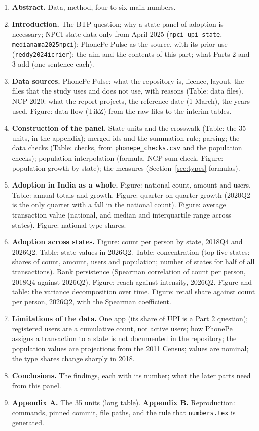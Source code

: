 \documentclass[11pt,a4paper]{article}
\newcommand{\f}[1]{\texttt{#1}}
\begin{document}
\begin{enumerate}
  \item \textbf{Abstract.} Data, method, four to six main numbers.
  \item \textbf{Introduction.} The BTP question; why a state panel of adoption is necessary; NPCI
        state data only from April 2025 (\f{npci\_upi\_state}, \f{medianama2025npci}); PhonePe Pulse as
        the source, with its prior use (\f{reddy2024icrier}); the aim and the contents of this part;
        what Parts 2 and 3 add (one sentence each).
  \item \textbf{Data sources.} PhonePe Pulse: what the repository is, licence, layout, the files that
        the study uses and does not use, with reasons (Table: data files). NCP 2020: what the report
        projects, the reference date (1 March), the years used. Figure: data flow (TikZ) from the raw
        files to the interim tables.
  \item \textbf{Construction of the panel.} State units and the crosswalk (Table: the 35 units, in the
        appendix); merged ids and the summation rule; parsing; the data checks (Table: checks, from
        \f{phonepe\_checks.csv} and the population checks); population interpolation (formula, NCP sum
        check, Figure: population growth by state); the measures (Section~\ref{sec:types} formulas).
  \item \textbf{Adoption in India as a whole.} Figure: national count, amount and users. Table: annual
        totals and growth. Figure: quarter-on-quarter growth (2020Q2 is the only quarter with a fall in
        the national count). Figure: average transaction value (national, and median and interquartile
        range across states). Figure: national type shares.
  \item \textbf{Adoption across states.} Figure: count per person by state, 2018Q4 and 2026Q2.
        Table: state values in 2026Q2. Table: concentration (top five states: shares of count, amount,
        users and population; number of states for half of all transactions). Rank persistence
        (Spearman correlation of count per person, 2018Q4 against 2026Q2). Figure: reach against
        intensity, 2026Q2. Figure and table: the variance decomposition over time. Figure: retail share
        against count per person, 2026Q2, with the Spearman coefficient.
  \item \textbf{Limitations of the data.} One app (its share of UPI is a Part 2 question); registered
        users are a cumulative count, not active users; how PhonePe assigns a transaction to a state is
        not documented in the repository; the population values are projections from the 2011 Census;
        values are nominal; the type shares change sharply in 2018.
  \item \textbf{Conclusions.} The findings, each with its number; what the later parts need from this
        panel.
  \item \textbf{Appendix A.} The 35 units (long table). \textbf{Appendix B.} Reproduction: commands,
        pinned commit, file paths, and the rule that \f{numbers.tex} is generated.
\end{enumerate}
\end{document}
